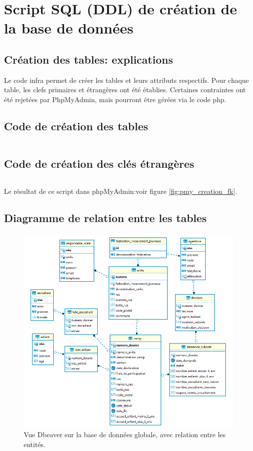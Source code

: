 \section{Script SQL (DDL) de création de la base de données}
\subsection{Création des tables: explications}
Le code infra permet de créer les tables et leurs attributs respectifs. Pour chaque table, les clefs primaires et étrangères ont été établies. Certaines contraintes ont été rejetées par PhpMyAdmin, mais pourront être gérées via le code php.

\subsection{Code de création des tables}
\inputminted[breaklines =true, autogobble, linenos, frame = single]{sql}{Codes/code_creation.tex}

\subsection{Code de création des clés étrangères}
\inputminted[breaklines =true, autogobble, linenos, frame = single]{sql}{Codes/code_key.tex}

Le résultat de ce script dans phpMyAdmin:voir figure \ref{fig:pmy_creation_fk}.

\subsection{Diagramme de relation entre les tables}
\begin{figure}[H]
    \centering
    \includegraphics[width=17cm]{Pictures/er_diagram.png}
    \caption{Vue Dbeaver sur la base de données globale, avec relation entre les entités.}
    \label{fig:er_diagram}
\end{figure}



